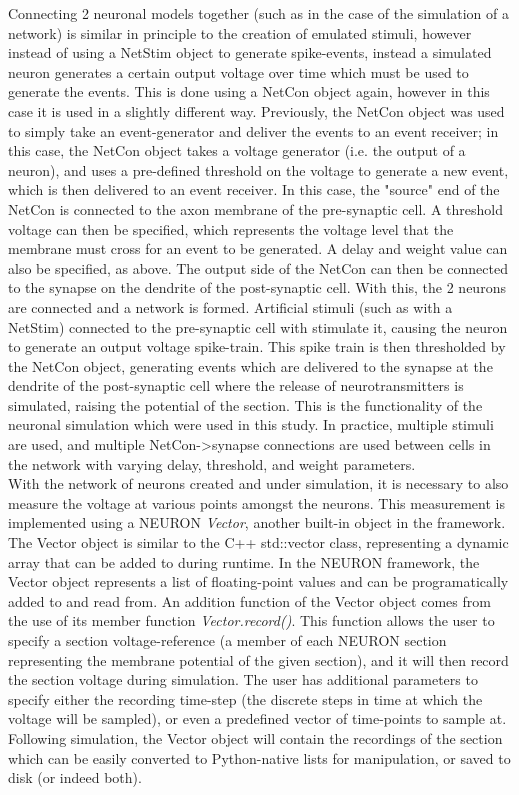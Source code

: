 Connecting 2 neuronal models together (such as in the case of the simulation of a network) is similar in principle to the creation of emulated stimuli, however instead of using a NetStim object to generate spike-events, instead a simulated neuron generates a certain output voltage over time which must be used to generate the events. This is done using a NetCon object again, however in this case it is used in a slightly different way. Previously, the NetCon object was used to simply take an event-generator and deliver the events to an event receiver; in this case, the NetCon object takes a voltage generator (i.e. the output of a neuron), and uses a pre-defined threshold on the voltage to generate a new event, which is then delivered to an event receiver. In this case, the "source" end of the NetCon is connected to the axon membrane of the pre-synaptic cell. A threshold voltage can then be specified, which represents the voltage level that the membrane must cross for an event to be generated. A delay and weight value can also be specified, as above. The output side of the NetCon can then be connected to the synapse on the dendrite of the post-synaptic cell. With this, the 2 neurons are connected and a network is formed. Artificial stimuli (such as with a NetStim) connected to the pre-synaptic cell with stimulate it, causing the neuron to generate an output voltage spike-train. This spike train is then thresholded by the NetCon object, generating events which are delivered to the synapse at the dendrite of the post-synaptic cell where the release of neurotransmitters is simulated, raising the potential of the section. This is the functionality of the neuronal simulation which were used in this study. In practice, multiple stimuli are used, and multiple NetCon->synapse connections are used between cells in the network with varying delay, threshold, and weight parameters.\\

With the network of neurons created and under simulation, it is necessary to also measure the voltage at various points amongst the neurons. This measurement is implemented using a NEURON \emph{Vector}, another built-in object in the framework. The Vector object is similar to the C++ std::vector class, representing a dynamic array that can be added to during runtime. In the NEURON framework, the Vector object represents a list of floating-point values and can be programatically added to and read from. An addition function of the Vector object comes from the use of its member function \emph{Vector.record()}. This function allows the user to specify a section voltage-reference (a member of each NEURON section representing the membrane potential of the given section), and it will then record the section voltage during simulation. The user has additional parameters to specify either the recording time-step (the discrete steps in time at which the voltage will be sampled), or even a predefined vector of time-points to sample at. Following simulation, the Vector object will contain the recordings of the section which can be easily converted to Python-native lists for manipulation, or saved to disk (or indeed both).\\

